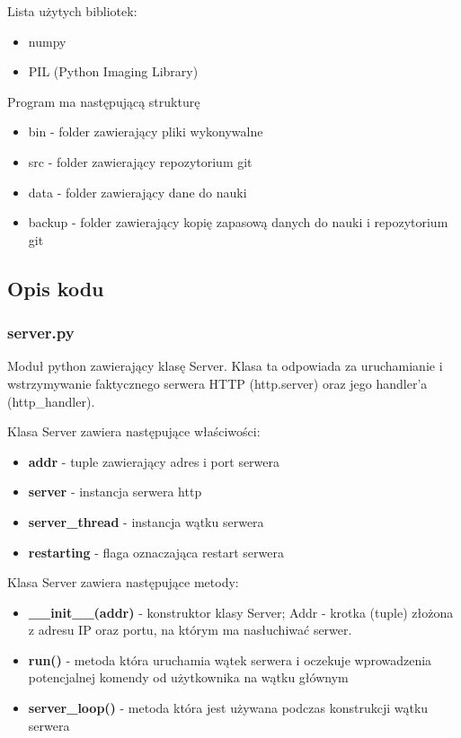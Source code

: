 \documentclass{article}
\begin{document}
Lista użytych bibliotek:
\begin{itemize}
    \item numpy
    \item PIL (Python Imaging Library)
\end{itemize}



Program ma następującą strukturę
\begin{itemize}
    \item bin - folder zawierający pliki wykonywalne
    \item src - folder zawierający repozytorium git
    \item data - folder zawierający dane do nauki
    \item backup - folder zawierający kopię zapasową danych do nauki i repozytorium git
\end{itemize}

\subsection{Opis kodu}
\subsubsection{server.py}
Moduł python zawierający klasę Server. Klasa ta odpowiada za uruchamianie i wstrzymywanie faktycznego serwera HTTP (http.server) oraz jego handler'a (http\_handler).

Klasa Server zawiera następujące właściwości:
\begin{itemize}
    \item \textbf{addr} - tuple zawierający adres i port serwera
    \item \textbf{server} - instancja serwera http
    \item \textbf{server\_thread} - instancja wątku serwera
    \item \textbf{restarting} - flaga oznaczająca restart serwera
\end{itemize}

Klasa Server zawiera następujące metody:
\begin{itemize}
    \item \textbf{\_\_init\_\_(addr)} - konstruktor klasy Server; Addr - krotka (tuple) złożona z adresu IP oraz portu, na którym ma nasłuchiwać serwer.
    \item \textbf{run()} - metoda która uruchamia wątek serwera i oczekuje wprowadzenia potencjalnej komendy od użytkownika na wątku głównym
    \item \textbf{server\_loop()} - metoda która jest używana podczas konstrukcji wątku serwera 
\end{itemize}
\end{document}
